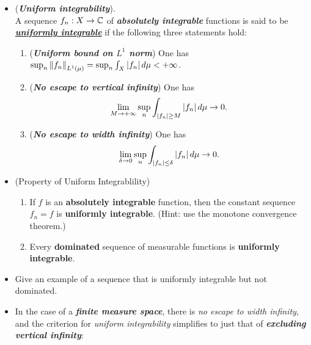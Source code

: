 \documentclass[11pt]{article}
\begin{document}
\begin{itemize}
\item \begin{definition} (\textbf{\emph{Uniform integrability}}).\\
A sequence $f_n : X \rightarrow {\mathbb C}$ of \textbf{\emph{absolutely integrable}} functions is said to be \underline{\textbf{\emph{uniformly integrable}}} if the following three statements hold:
\begin{enumerate}
\item (\textbf{\emph{Uniform bound on $L^1$ norm}}) One has $\sup_{n}\left\|f_n\right\|_{L^1(\mu)} = \sup_{n}\int_X \left\lvert f_n \right\rvert d\mu < +\infty$.
\item (\textbf{\emph{No escape to vertical infinity}}) One has 
\begin{align*}
\lim\limits_{M \rightarrow +\infty}\sup_{n}\int_{\left\lvert f_n \right\rvert \ge M} \left\lvert f_n \right\rvert d\mu \rightarrow 0.
\end{align*}
\item (\textbf{\emph{No escape to width infinity}})  One has 
\begin{align*}
\lim\limits_{\delta \rightarrow 0}\sup_{n}\int_{\left\lvert f_n \right\rvert \le \delta} \left\lvert f_n \right\rvert d\mu \rightarrow 0.
\end{align*}
\end{enumerate}
\end{definition}

\item \begin{proposition} (Property of Uniform Integrablility)
\begin{enumerate}
\item If $f$ is an \textbf{absolutely integrable} function, then the constant sequence $f_n = f$ is \textbf{uniformly integrable}. (Hint: use the monotone convergence theorem.)
\item Every \textbf{dominated} sequence of measurable functions is \textbf{uniformly integrable}.
\end{enumerate}
\end{proposition}

\item \begin{exercise}
Give an example of a sequence that is uniformly integrable but not dominated.
\end{exercise}

\item \begin{remark}
In the case of a \emph{\textbf{finite measure space}}, there is \emph{no escape to width infinity}, and the criterion for \emph{uniform integrability} simplifies to just
that of \emph{\textbf{excluding vertical infinity}}:


\end{remark}
\end{itemize}
\end{document}

